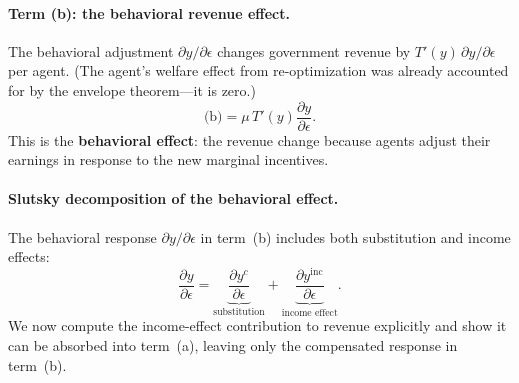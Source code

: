 \documentclass[12pt,a4paper]{article}
\theoremstyle{definition}
\theoremstyle{plain}
\theoremstyle{remark}
\begin{document}
\paragraph{Term (b): the behavioral revenue effect.}
The behavioral adjustment $\partial y/\partial\epsilon$ changes
government revenue by $T'(y)\,\partial y/\partial\epsilon$
per agent. (The agent's welfare effect from re-optimization
was already accounted for by the envelope theorem---it is zero.)
\begin{equation}
\label{eq:term-b-1D}
\text{(b)} = \mu\,T'(y)\frac{\partial y}{\partial\epsilon}.
\end{equation}
This is the \textbf{behavioral effect}: the revenue change
because agents adjust their earnings in response to the new
marginal incentives.

\paragraph{Slutsky decomposition of the behavioral effect.}
The behavioral response $\partial y/\partial\epsilon$ in
term~(b) includes both substitution and income effects:
\[
\frac{\partial y}{\partial\epsilon}
=
\underbrace{\frac{\partial y^c}{\partial\epsilon}}_{\text{substitution}}
+
\underbrace{\frac{\partial y^{\text{inc}}}{\partial\epsilon}}_{\text{income effect}}.
\]
We now compute the income-effect contribution to revenue
explicitly and show it can be absorbed into term~(a), leaving
only the compensated response in term~(b).
\end{document}
